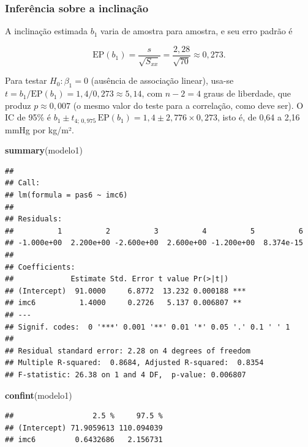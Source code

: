 \documentclass[
]{book}
\newenvironment{Shaded}{\begin{snugshade}}{\end{snugshade}}
\newcommand{\FunctionTok}[1]{\textcolor[rgb]{0.13,0.29,0.53}{\textbf{#1}}}
\newcommand{\NormalTok}[1]{#1}
\begin{document}
\subsubsection{Inferência sobre a inclinação}\label{inferuxeancia-sobre-a-inclinauxe7uxe3o}

A inclinação estimada \(b_1\) varia de amostra para amostra, e seu erro padrão é

\[
\text{EP}(b_1) = \frac{s}{\sqrt{S_{xx}}} = \frac{2{,}28}{\sqrt{70}} \approx 0{,}273 .
\]

Para testar \(H_0\colon \beta_1 = 0\) (ausência de associação linear), usa-se \(t = b_1/\text{EP}(b_1) = 1{,}4/0{,}273 \approx 5{,}14\), com \(n - 2 = 4\) graus de liberdade, que produz \(p \approx 0{,}007\) (o mesmo valor do teste para a correlação, como deve ser). O IC de 95\% é \(b_1 \pm t_{4;\,0{,}975}\,\text{EP}(b_1) = 1{,}4 \pm 2{,}776 \times 0{,}273\), isto é, de 0,64 a 2,16 mmHg por kg/m².

\begin{Shaded}
\begin{Highlighting}[]
\FunctionTok{summary}\NormalTok{(modelo1)}
\end{Highlighting}
\end{Shaded}

\begin{verbatim}
## 
## Call:
## lm(formula = pas6 ~ imc6)
## 
## Residuals:
##          1          2          3          4          5          6 
## -1.000e+00  2.200e+00 -2.600e+00  2.600e+00 -1.200e+00  8.374e-15 
## 
## Coefficients:
##             Estimate Std. Error t value Pr(>|t|)    
## (Intercept)  91.0000     6.8772  13.232 0.000188 ***
## imc6          1.4000     0.2726   5.137 0.006807 ** 
## ---
## Signif. codes:  0 '***' 0.001 '**' 0.01 '*' 0.05 '.' 0.1 ' ' 1
## 
## Residual standard error: 2.28 on 4 degrees of freedom
## Multiple R-squared:  0.8684, Adjusted R-squared:  0.8354 
## F-statistic: 26.38 on 1 and 4 DF,  p-value: 0.006807
\end{verbatim}

\begin{Shaded}
\begin{Highlighting}[]
\FunctionTok{confint}\NormalTok{(modelo1)}
\end{Highlighting}
\end{Shaded}

\begin{verbatim}
##                  2.5 %     97.5 %
## (Intercept) 71.9059613 110.094039
## imc6         0.6432686   2.156731
\end{verbatim}
\end{document}
